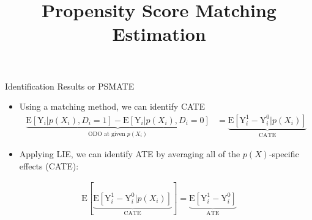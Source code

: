 \documentclass[hyperref={pdfpagelabels=false}]{beamer}
\begin{document}
\begin{frame}{Identification Results or PSM}{ATE}
	\begin{itemize}
		
		\item Using a matching method, we can identify CATE
		\vspace{0.2cm}
		\begin{equation*}
		\begin{aligned}
	\underbrace{\mathrm{E}[\mathrm{Y}_{i}|p(X_{i}),D_{i}=1] - \mathrm{E}[\mathrm{Y}_{i}|p(X_{i}),D_{i}=0]}_{\text{ODO at given $p(X_{i})$}} &= \underbrace{\mathrm{E}[\mathrm{Y}^{1}_{i}-\mathrm{Y}^{0}_{i}|p(X_{i})]}_{\text{CATE}} 
		\end{aligned}
		\end{equation*}	
		
		
		\item Applying LIE, we can identify ATE by averaging all of the $p(X)$-specific effects (CATE):
		\vspace{0.2cm}
		
	\end{itemize}
	\begin{equation*}
	\begin{aligned}
	\mathrm{E}[\underbrace{\mathrm{E}[\mathrm{Y}^{1}_{i}-\mathrm{Y}^{0}_{i}|p(X_{i})]}_{\text{CATE}}] 
	=\underbrace{\mathrm{E}[\mathrm{Y}^{1}_{i}-\mathrm{Y}^{0}_{i}]}_{\text{ATE}}
	
	\end{aligned}
	\end{equation*}	
	
\end{frame}








\title[]  
{Propensity Score Matching \\ Estimation}


\author 
{}

\institute{}






\date
{}
\end{document}
